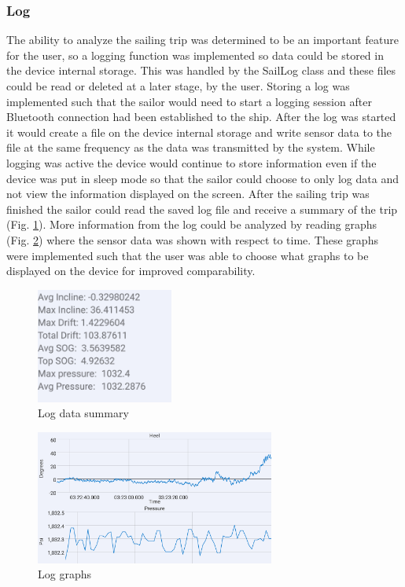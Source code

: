 \subsubsection{Log}
The ability to analyze the sailing trip was determined to be an important feature for the user, so a logging function was implemented so data could be stored in the device internal storage. This was handled by the SailLog class and these files could be read or deleted at a later stage, by the user. Storing a log was implemented such that the sailor would need to start a logging session after Bluetooth connection had been established to the ship. After the log was started it would create a file on the device internal storage and write sensor data to the file at the same frequency as the data was transmitted by the system. While logging was active the device would continue to store information even if the device was put in sleep mode so that the sailor could choose to only log data and not view the information displayed on the screen. After the sailing trip was finished the sailor could read the saved log file and receive a summary of the trip (Fig. \ref{log-summary}). More information from the log could be analyzed by reading graphs (Fig. \ref{log-graph}) where the sensor data was shown with respect to time. These graphs were implemented such that the user was able to choose what graphs to be displayed on the device for improved comparability.
\begin{figure}[H]
\centering
\includegraphics[width=0.4\textwidth]{Figures/log_data.png}
\caption{Log data summary}
\label{log-summary}
\end{figure}
\begin{figure}[H]
\centering
\includegraphics[width=0.7\textwidth]{Figures/log_graph.png}
\caption{Log graphs}
\label{log-graph}
\end{figure}

